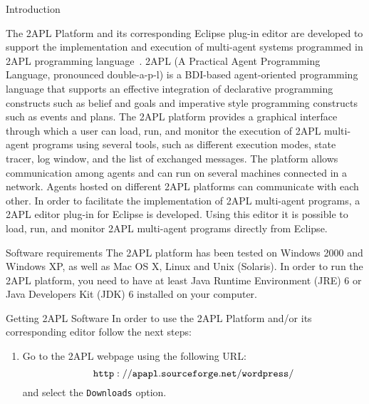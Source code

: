 \begin{chapter}{Introduction}
\label{chap:introduction}

The 2APL Platform and its corresponding Eclipse plug-in editor are
developed to support the implementation and execution of multi-agent
systems programmed in 2APL programming
language~\cite{Dastani:08a,D-RULECHP09,CLIMA09}. 2APL (A Practical
Agent Programming Language, pronounced double-a-p-l) is a BDI-based
agent-oriented programming language that supports an effective
integration of declarative programming constructs such as belief and
goals and imperative style programming constructs such as events and
plans. The 2APL platform provides a graphical interface through
which a user can load, run, and monitor the execution of 2APL
multi-agent programs using several tools, such as different
execution modes, state tracer, log window, and the list of exchanged
messages. The platform allows communication among agents and can run
on several machines connected in a network. Agents hosted on
different 2APL platforms can communicate with each other. In order
to facilitate the implementation of 2APL multi-agent programs, a
2APL editor plug-in for Eclipse is developed. Using this editor it
is possible to load, run, and monitor 2APL multi-agent programs
directly from Eclipse.

\begin{section}{Software requirements}
The 2APL platform has been tested on Windows 2000 and Windows XP, as
well as Mac OS X, Linux and Unix (Solaris). In order to run the 2APL
platform, you need to have at least Java Runtime Environment (JRE) 6
or Java Developers Kit (JDK) 6 installed on your computer.
\end{section}

\begin{section}{Getting 2APL Software}
In order to use the 2APL Platform and/or its corresponding editor
follow the next steps:
\begin{enumerate}
    \item Go to the 2APL webpage using the following URL:
          $${\tt http://apapl.sourceforge.net/wordpress/}$$
          and select the {\tt Downloads} option.


\end{enumerate}
\end{section}
\end{chapter}
